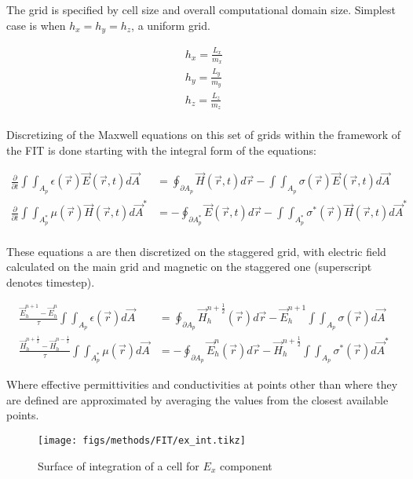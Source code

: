     The grid is specified by cell size and overall computational domain size.
    Simplest case is when $h_x = h_y = h_z$, a uniform grid.

    \begin{align}
        h_x = \frac{L_x}{m_x} \\
        h_y = \frac{L_y}{m_y} \\
        h_z = \frac{L_z}{m_z} \\
    \end{align}

    Discretizing of the Maxwell equations on this set of grids within the framework of the
    FIT is done starting with the integral form of the equations:

    \begin{align}
        \frac{\partial}{\partial t}\int\int_{A_p} \epsilon(\vec{r})\vec{E}(\vec{r},t)d\vec{A}
            &= \oint_{\partial A_p} \vec{H}(\vec{r}, t)d\vec{r} - \int\int_{A_p}\sigma(\vec{r})\vec{E}(\vec{r}, t)d\vec{A} \\
        \frac{\partial}{\partial t}\int\int_{A_p^*} \mu(\vec{r})\vec{H}(\vec{r}, t)d\vec{A}^*
            &= -\oint_{\partial A_p^*} \vec{E}(\vec{r},t)d\vec{r} - \int\int_{A_p^*}\sigma^*(\vec{r})\vec{H}(\vec{r},t)d\vec{A}^*\\
    \end{align}

    These equations a are then discretized on the staggered grid, with electric field calculated on the main
    grid and magnetic on the staggered one (superscript denotes timestep).

    \begin{align}
        \frac{\vec{E}_h^{n+1} - \vec{E}_h^{n}}{\tau}\int\int_{A_p}\epsilon(\vec{r})d\vec{A}
            &= \oint_{\partial A_p}\vec{H}_h^{n+\frac{1}{2}}(\vec{r})d\vec{r} - \vec{E}_h^{n+1}\int\int_{A_p}\sigma(\vec{r})d\vec{A} \\
        \frac{\vec{H}_h^{n+\frac{1}{2}} - \vec{H}_h^{n-\frac{1}{2}}}{\tau} \int\int_{A_p^*}\mu(\vec{r})d\vec{A}
            &= - \oint_{\partial A_p}\vec{E}_h^{n}(\vec{r})d\vec{r} - \vec{H}_h^{n+\frac{1}{2}}\int\int_{A_p}\sigma^*(\vec{r})d\vec{A}^*
    \end{align}

    Where effective permittivities and conductivities at points other than where they are defined are
    approximated by averaging the values from the closest available points.

    \begin{figure}[!ht]
        \centering
        \texttt{[image: figs/methods/FIT/ex\_int.tikz]}
        \caption{Surface of integration of a cell for $E_x$ component}
        \label{fig:Ex_Int}
    \end{figure}

